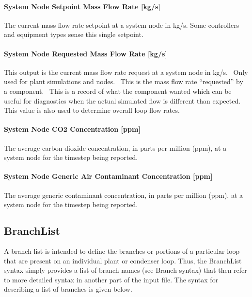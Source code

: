 \paragraph{System Node Setpoint Mass Flow Rate {[}kg/s{]}}\label{system-node-setpoint-mass-flow-rate-kgs}

The current mass flow rate setpoint at a system node in kg/s. Some controllers and equipment types sense this single setpoint.

\paragraph{System Node Requested Mass Flow Rate {[}kg/s{]}}\label{system-node-requested-mass-flow-rate-kgs}

This output is the current mass flow rate request at a system node in kg/s.~ Only used for plant simulations and nodes.~ This is the mass flow rate ``requested'' by a component.~ This is a record of what the component wanted which can be useful for diagnostics when the actual simulated flow is different than expected.~ This value is also used to determine overall loop flow rates.

\paragraph{System Node CO2 Concentration {[}ppm{]}}\label{system-node-co2-concentration-ppm}

The average carbon dioxide concentration, in parts per million (ppm), at a system node for the timestep being reported.

\paragraph{System Node Generic Air Contaminant Concentration {[}ppm{]}}\label{system-node-generic-air-contaminant-concentration-ppm}

The average generic contaminant concentration, in parts per million (ppm), at a system node for the timestep being reported.

\subsection{BranchList}\label{branchlist}

A branch list is intended to define the branches or portions of a particular loop that are present on an individual plant or condenser loop. Thus, the BranchList syntax simply provides a list of branch names (see Branch syntax) that then refer to more detailed syntax in another part of the input file. The syntax for describing a list of branches is given below.

